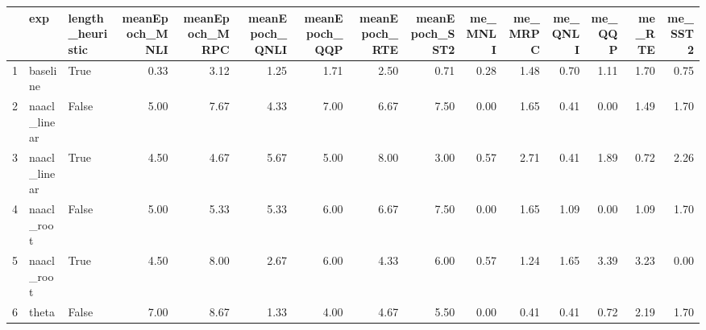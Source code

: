 \begin{table}[ht]
\centering
\begin{tabular}{rllrrrrrrrrrrrr}
  \hline
 & exp & length\_heuristic & meanEpoch\_MNLI & meanEpoch\_MRPC & meanEpoch\_QNLI & meanEpoch\_QQP & meanEpoch\_RTE & meanEpoch\_SST2 & me\_MNLI & me\_MRPC & me\_QNLI & me\_QQP & me\_RTE & me\_SST2 \\ 
  \hline
1 & baseline & True & 0.33 & 3.12 & 1.25 & 1.71 & 2.50 & 0.71 & 0.28 & 1.48 & 0.70 & 1.11 & 1.70 & 0.75 \\ 
  2 & naacl\_linear & False & 5.00 & 7.67 & 4.33 & 7.00 & 6.67 & 7.50 & 0.00 & 1.65 & 0.41 & 0.00 & 1.49 & 1.70 \\ 
  3 & naacl\_linear & True & 4.50 & 4.67 & 5.67 & 5.00 & 8.00 & 3.00 & 0.57 & 2.71 & 0.41 & 1.89 & 0.72 & 2.26 \\ 
  4 & naacl\_root & False & 5.00 & 5.33 & 5.33 & 6.00 & 6.67 & 7.50 & 0.00 & 1.65 & 1.09 & 0.00 & 1.09 & 1.70 \\ 
  5 & naacl\_root & True & 4.50 & 8.00 & 2.67 & 6.00 & 4.33 & 6.00 & 0.57 & 1.24 & 1.65 & 3.39 & 3.23 & 0.00 \\ 
  6 & theta & False & 7.00 & 8.67 & 1.33 & 4.00 & 4.67 & 5.50 & 0.00 & 0.41 & 0.41 & 0.72 & 2.19 & 1.70 \\ 
   \hline
\end{tabular}
\end{table}
